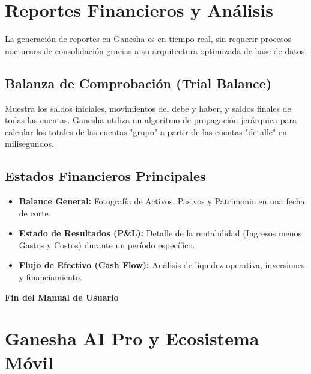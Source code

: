 \documentclass[12pt, a4paper, oneside]{book}
\begin{document}
\chapter{Reportes Financieros y Análisis}

La generación de reportes en Ganesha es en tiempo real, sin requerir procesos nocturnos de consolidación gracias a su arquitectura optimizada de base de datos.

\section{Balanza de Comprobación (Trial Balance)}
Muestra los saldos iniciales, movimientos del debe y haber, y saldos finales de todas las cuentas. Ganesha utiliza un algoritmo de propagación jerárquica para calcular los totales de las cuentas "grupo" a partir de las cuentas "detalle" en milisegundos.

\section{Estados Financieros Principales}
\begin{itemize}
    \item \textbf{Balance General:} Fotografía de Activos, Pasivos y Patrimonio en una fecha de corte.
    \item \textbf{Estado de Resultados (P\&L):} Detalle de la rentabilidad (Ingresos menos Gastos y Costos) durante un período específico.
    \item \textbf{Flujo de Efectivo (Cash Flow):} Análisis de liquidez operativa, inversiones y financiamiento.
\end{itemize}

\vspace{2cm}
\begin{center}
    \Large \textbf{Fin del Manual de Usuario}
\end{center}

\chapter{Ganesha AI Pro y Ecosistema Móvil}
\end{document}
